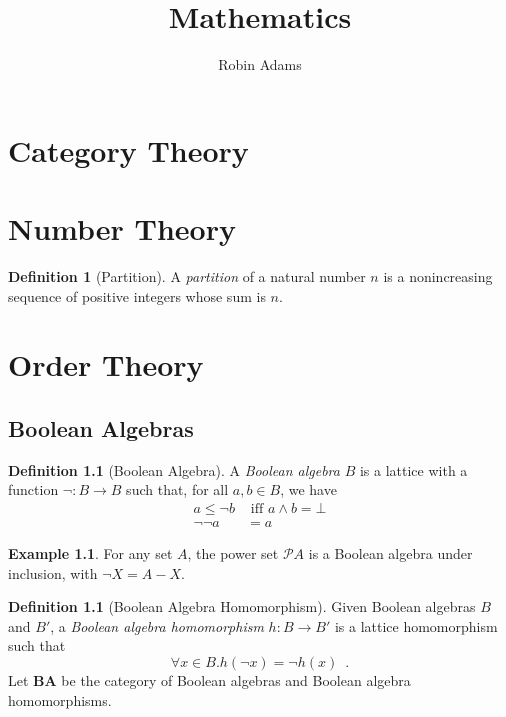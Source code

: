\documentclass{book}
\title{Mathematics}
\author{Robin Adams}
\theoremstyle{definition}
\newtheorem{df}[prop]{Definition}
\newtheorem{ex}[prop]{Example}
\begin{document}
\maketitle
\tableofcontents


\part{Category Theory}



\part{Number Theory}

\begin{df}[Partition]
A \emph{partition} of a natural number $n$ is a nonincreasing sequence of positive integers whose sum is $n$.
\end{df}

\part{Order Theory}

\chapter{Boolean Algebras}

\begin{df}[Boolean Algebra]
A \emph{Boolean algebra} $B$ is a lattice %
with a function $\neg : B \rightarrow B$ such that, for all $a,b \in B$, we have
\begin{align*}
a \leq \neg b & \text{ iff } a \wedge b = \bot \\
\neg \neg a & = a
\end{align*}
\end{df}

\begin{ex}
For any set $A$, the power set $\mathcal{P} A$ is a Boolean algebra under inclusion, with $\neg X = A - X$.
\end{ex}

\begin{df}[Boolean Algebra Homomorphism]
Given Boolean algebras $B$ and $B'$, a \emph{Boolean algebra homomorphism} $h : B \rightarrow B'$ is a lattice homomorphism such that
\[ \forall x \in B. h(\neg x) = \neg h(x) \enspace . \]
Let $\mathbf{BA}$ be the category of Boolean algebras and Boolean algebra homomorphisms.
\end{df}
\end{document}
